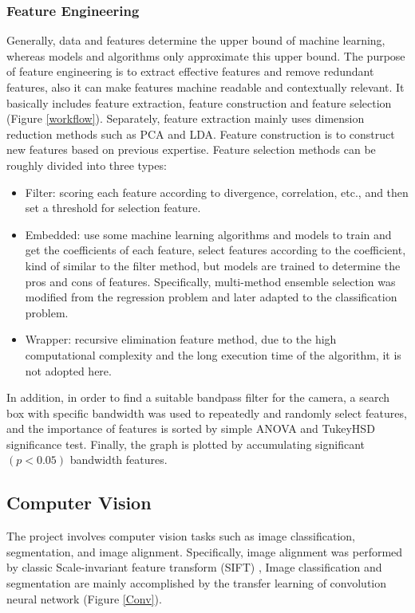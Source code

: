 \documentclass[12pt,a4paper]{article}
\begin{document}
\subsubsection{Feature Engineering}
Generally, data and features determine the upper bound of machine learning, whereas models and algorithms only approximate this upper bound. The purpose of feature engineering is to extract effective features and remove redundant features, also it can make features machine readable and contextually relevant. It basically includes feature extraction, feature construction and feature selection (Figure \ref{workflow}). Separately, feature extraction mainly uses dimension reduction methods such as PCA and LDA. Feature construction is to construct new features based on previous expertise. Feature selection methods can be roughly divided into three types:

\begin{itemize}[noitemsep] %
    \item Filter: scoring each feature according to divergence, correlation, etc., and then set a threshold for selection feature. 
    \item Embedded: use some machine learning algorithms and models to train and get the coefficients of each feature, select features according to the coefficient, kind of similar to the filter method, but models are trained to determine the pros and cons of features. Specifically, multi-method ensemble selection \citep{feilhauer2015multi} was modified from the regression problem and later adapted to the classification problem.
    \item Wrapper: recursive elimination feature method, due to the high computational complexity and the long execution time of the algorithm, it is not adopted here.
\end{itemize}
In addition, in order to find a suitable bandpass filter for the camera, a search box with specific bandwidth was used to repeatedly and randomly select features, and the importance of features is sorted by simple ANOVA and TukeyHSD significance test. Finally, the graph is plotted by accumulating significant $(p<0.05)$ bandwidth features.

\subsection{Computer Vision}
The project involves computer vision tasks such as image classification, segmentation, and image alignment. Specifically, image alignment was performed by classic Scale-invariant feature transform (SIFT) \citep{lowe1999object}, Image classification and segmentation are mainly accomplished by the transfer learning of convolution neural network (Figure \ref{Conv}).
\end{document}
